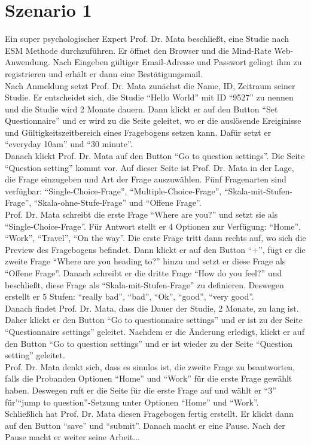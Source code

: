 \documentclass[a4paper]{scrreprt}
\begin{document}
		\section{Szenario 1}
                Ein super psychologischer Expert Prof. Dr. Mata beschließt, eine Studie nach ESM Methode durchzuf\"uhren. Er \"offnet den Browser und die Mind-Rate Web-Anwendung. Nach Eingeben g\"ultiger Email-Adresse und Passwort gelingt ihm zu registrieren und erh\"alt er dann eine Bestätigungsmail. \\
                Nach Anmeldung setzt Prof. Dr. Mata zun\"achst die Name, ID, Zeitraum seiner Studie. Er entscheidet sich, die Studie ``Hello World'' mit ID ``9527'' zu nennen und die Studie wird 2 Monate dauern. Dann klickt er auf den Button ``Set Questionnaire'' und er wird zu die Seite geleitet, wo er die auslösende Ereiginisse und G\"ultigkeitszeitbereich eines Fragebogens setzen kann. Daf\"ur setzt er ``everyday 10am'' und ``30 minute''. \\
                Danach klickt Prof. Dr. Mata auf den Button ``Go to question settings''. Die Seite ``Question setting'' kommt vor. Auf dieser Seite ist Prof. Dr. Mata in der Lage, die Frage einzugeben und Art der Frage auszuw\"ahlen. F\"unf Fragenarten sind verf\"ugbar: ``Single-Choice-Frage'', ``Multiple-Choice-Frage'', ``Skala-mit-Stufen-Frage'', ``Skala-ohne-Stufe-Frage'' und ``Offene Frage''. \\
                Prof. Dr. Mata schreibt die erste Frage ``Where are you?'' und setzt sie als ``Single-Choice-Frage''. Für Antwort stellt er 4 Optionen zur Verf\"ugung: ``Home'', ``Work'', ``Travel'', ``On the way''. Die erste Frage tritt dann rechts auf, wo sich die Preview des Fragebogens befindet. Dann klickt er auf den Button ``+'', f\"ugt er die zweite Frage ``Where are you heading to?'' hinzu und setzt er diese Frage als ``Offene Frage''. Danach schreibt er die dritte Frage ``How do you feel?'' und beschließt, diese Frage als ``Skala-mit-Stufen-Frage'' zu definieren. Deswegen erstellt er 5 Stufen: ``really bad'', ``bad'', ``Ok'', ``good'', ``very good''. \\
                Danach findet Prof. Dr. Mata, dass die Dauer der Studie, 2 Monate,  zu lang ist. Daher klickt er den Button ``Go to questionnaire settings'' und er ist zu der Seite ``Questionnaire settings'' geleitet. Nachdem er die \"Anderung erledigt, klickt er auf den Button ``Go to question settings'' und er ist wieder zu der Seite ``Question setting'' geleitet. \\
                Prof. Dr. Mata denkt sich, dass es sinnlos ist, die zweite Frage zu beantworten, falls die Probanden Optionen ``Home'' und ``Work'' f\"ur die erste Frage gew\"ahlt haben. Deswegen ruft er die Seite f\"ur die erste Frage auf und w\"ahlt er ``3'' f\"ur'``jump to question''-Setzung unter Optionen ``Home'' und ``Work''. \\
                Schließlich hat Prof. Dr. Mata diesen Fragebogen fertig erstellt. Er klickt dann auf den Button ``save'' und ``submit''. Danach macht er eine Pause. Nach der Pause macht er weiter seine Arbeit...\\
\end{document}
